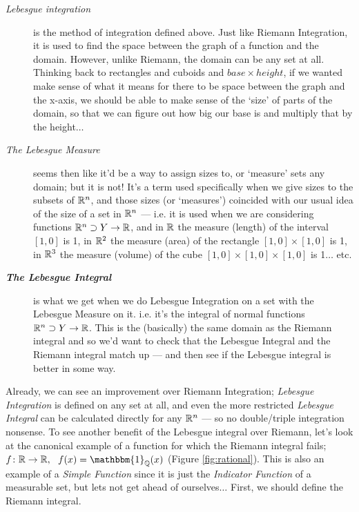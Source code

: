 \begin{description}
\item[\em Lebesgue integration\/] is the method of integration defined above. Just like Riemann Integration, it is used to find the space between the graph of a function and the domain. However, unlike Riemann, the domain can be any set at all. Thinking back to rectangles and cuboids and $base \times height$, if we wanted make sense of what it means for there to be space between the graph and the x-axis, we should be able to make sense of the `size' of parts of the domain, so that we can figure out how big our base is and multiply that by the height$\ldots$
%
\item[\em The Lebesgue Measure\/] seems then like it'd be a way to assign sizes to, or `measure' sets any domain; but it is not! It's a term used specifically when we give sizes to the subsets of $\mathbb{R}^n$, and those sizes (or `measures') coincided with our usual idea of the size of a set in $\mathbb{R}^n$ --- i.e. it is used when we are considering functions $\mathbb{R}^n \supset Y \rightarrow \mathbb{R}$, and in $\mathbb{R}$ the measure (length) of the interval $[1, 0]$ is 1, in $\mathbb{R}^2$ the measure (area) of the rectangle $[1, 0] \times [1, 0]$ is 1, in $\mathbb{R}^3$ the measure (volume) of the cube $[1, 0] \times [1, 0] \times [1, 0]$ is 1$\ldots$ etc. 
%
\item[\bf \em The Lebesgue Integral\/] is what we get when we do Lebesgue Integration on a set with the Lebesgue Measure on it. i.e. it's the integral of normal functions $\mathbb{R}^n \supset Y \rightarrow \mathbb{R}$. This is the (basically) the same domain as the Riemann integral and so we'd want to check that the Lebesgue Integral and the Riemann integral match up --- and then see if the Lebesgue integral is better in some way.
\end{description}

Already, we can see an improvement over Riemann Integration; \emph{Lebesgue Integration} is defined on any set at all, and even the more restricted \emph{Lebesgue Integral} can be calculated directly for any $\mathbb{R}^n$ --- so no double/triple integration nonsense. To see another benefit of the Lebesgue integral over Riemann, let's look at the canonical example of a function for which the Riemann integral fails; $f\colon \R \rightarrow \R,\ \ f(x) = \mathbbm{1}_\Q(x)$ (Figure \ref{fig:rational}). This is also an example of a \emph{Simple Function} since it is just the \emph{Indicator Function} of a measurable set, but lets not get ahead of ourselves$\ldots$ First, we should define the Riemann integral. 

